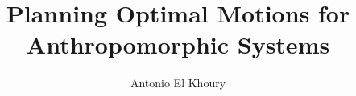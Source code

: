 \documentclass[a4paper,twoside,openright,11pt]{book}
\begin{document}

%
%
%
%
\frontmatter
\author{Antonio El Khoury}
\title{Planning Optimal Motions for Anthropomorphic Systems}

%
%
%
\tableofcontents{\thispagestyle{headings}}

%
\mainmatter
\pagestyle{empty}

\pagestyle{fancy}
\renewcommand{\headrulewidth}{0pt}
\fancyhf{}
\fancyhead[LE]{\leftmark} %
\fancyhead[RE]{\thepage} %
\fancyhead[LO]{\rightmark} %
\fancyhead[RO]{\thepage} %
\fancyfootoffset[RO]{\marginparwidth - \marginparsep}







\appendices


\backmatter

%
\begin{singlespace}

\end{singlespace}
%
\end{document}
